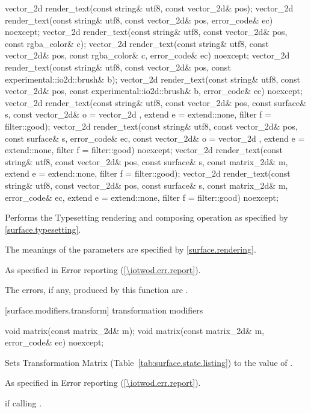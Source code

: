 \begin{itemdecl}
vector_2d render_text(const string& utf8, const vector_2d& pos);
vector_2d render_text(const string& utf8, const vector_2d& pos,
  error_code& ec) noexcept;
vector_2d render_text(const string& utf8, const vector_2d& pos,
  const rgba_color& c);
vector_2d render_text(const string& utf8, const vector_2d& pos,
  const rgba_color& c, error_code& ec) noexcept;
vector_2d render_text(const string& utf8, const vector_2d& pos,
  const experimental::io2d::brush& b);
vector_2d render_text(const string& utf8, const vector_2d& pos,
  const experimental::io2d::brush& b, error_code& ec) noexcept;
vector_2d render_text(const string& utf8, const vector_2d& pos,
  const surface& s, const vector_2d& o = vector_2d{ },
  extend e = extend::none, filter f = filter::good);
vector_2d render_text(const string& utf8, const vector_2d& pos,
  const surface& s, error_code& ec, const vector_2d& o = vector_2d{ },
  extend e = extend::none, filter f = filter::good) noexcept;
vector_2d render_text(const string& utf8, const vector_2d& pos,
  const surface& s, const matrix_2d& m, extend e = extend::none,
  filter f = filter::good);
vector_2d render_text(const string& utf8, const vector_2d& pos,
  const surface& s, const matrix_2d& m, error_code& ec,
  extend e = extend::none, filter f = filter::good) noexcept;
\end{itemdecl}
\begin{itemdescr}
\pnum
\effects
Performs the Typesetting rendering and composing operation as specified by \ref{surface.typesetting}.

\pnum
The meanings of the parameters are specified by \ref{surface.rendering}.

\pnum
\throws
As specified in Error reporting (\ref{\iotwod.err.report}).

\pnum
\errors
The errors, if any, produced by this function are .
\end{itemdescr}

 [surface.modifiers.transform] { transformation modifiers}

\begin{itemdecl}
void matrix(const matrix_2d& m);
void matrix(const matrix_2d& m, error_code& ec) noexcept;
\end{itemdecl}
\begin{itemdescr}
\pnum
\effects
Sets Transformation Matrix (Table~\ref{tab:surface.state.listing}) to the value of .

\pnum
\throws
As specified in Error reporting (\ref{\iotwod.err.report}).

\pnum
\errors
{} if calling .
\end{itemdescr}


